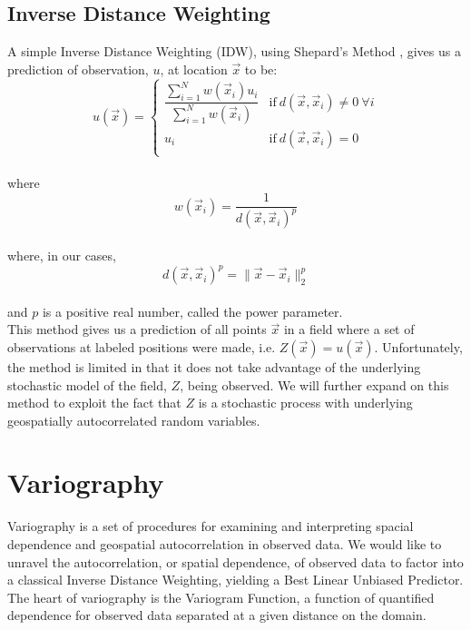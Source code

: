 \documentclass[11pt]{ucthesis}
\begin{document}
\subsection{Inverse Distance Weighting}
A simple Inverse Distance Weighting (IDW), using Shepard's Method \cite{shepard:idw}, gives us a prediction of observation, $u$, at location $\vec{x}$ to be:
\begin{equation}
	u(\vec{x})=\begin{cases}
			\dfrac{\sum\limits_{i=1}^N w(\vec{x}_i)u_i}{\sum\limits_{i=1}^{N} w(\vec{x}_i)} & \text{if}\ d(\vec{x},\vec{x}_i) \neq 0\ \forall i \\
			u_i & \text{if}\ d(\vec{x},\vec{x}_{i})=0\\
		\end{cases}
\end{equation}\\
where\\
\begin{equation}
	w(\vec{x}_i)=\frac{1}{d(\vec{x},\vec{x}_{i})^{p}}
\end{equation}\\
where, in our cases,\\
\begin{equation}
	d(\vec{x},\vec{x}_{i})^{p} = \|\vec{x}-\vec{x}_i\|_{2}^p
\end{equation}\\
and $p$ is a positive real number, called the power parameter.\\ %
This method gives us a prediction of all points $\vec{x}$ in a field where a set of observations at labeled positions were made, i.e. $Z(\vec{x})=u(\vec{x})$. Unfortunately, the method is limited in that it does not take advantage of the underlying stochastic model of the field, $Z$, being observed. We will further expand on this method to exploit the fact that $Z$ is a stochastic process with underlying geospatially autocorrelated random variables.

\section{Variography}
Variography is a set of procedures for examining and interpreting spacial dependence and geospatial autocorrelation in observed data. We would like to unravel the autocorrelation, or spatial dependence, of observed data to factor into a classical Inverse Distance Weighting, yielding a Best Linear Unbiased Predictor. The heart of variography is the Variogram Function, a function of quantified dependence for observed data separated at a given distance on the domain.
\end{document}
